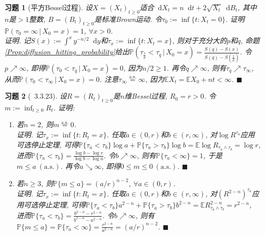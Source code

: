\documentclass{ctexart}
\theoremstyle{definition}
\theoremstyle{remark}
\theoremstyle{plain}
\newtheorem{Ex}{习题}[section]
\newenvironment{Prf}{\vspace{1ex}\textbf{\\}{\color{red}\textit{证明}}.\normalfont}{\color{red}\hfill$\blacksquare$\vspace{1ex}\par}
\newcommand{\1}{\mathbbm{1}}				%
\newcommand{\as}{\mathrm{a.s.}}				%
\renewcommand{\P}{\mathbb{P}}				%
\newcommand{\E}{\mathbb{E}}					%
\renewcommand*{\d}{\mathop{}\!\mathrm{d}}	%
\begin{document}
\begin{Ex}[平方Bessel过程]
设$X = (X_{t})_{t \ge 0}$适合$\d X_{t} = n \d t + 2 \sqrt{X_{t}} \d B_{t}$, 其中$n$是$>1$整数, $B = (B_{t})_{t \ge 0}$是标准Brown运动. 令$\tau_{0} := \inf\{ t : X_{t} = 0 \}$. 证明$\P(\tau_{0}=\infty\,|\,X_{0}=x) = 1$, $\forall x > 0$.
\begin{Prf}
记$S(x) := \int^{x} y^{-n/2} \d y$和$\tau_{x} := \inf\{ t : X_{t} = x \}$, 则对于充分大的$p$和$q$, 命题\ref{Prop:diffusion_hitting_probability}给出$\P(\tau_{\frac{1}{p}}<\tau_{q}\,|\,X_{0}=x) = \frac{S(q)-S(x)}{S(q)-S(\frac{1}{p})}$. 令$p \nearrow \infty$, 即得$\P(\tau_{0}<\tau_{q}\,|\,X_{0}=x) = 0$, 因为$n/2 \ge 1$. 再令$q \nearrow \infty$, 则有$\tau_{q} \nearrow \tau_{\infty}$, 从而$\P(\tau_{0}<\tau_{\infty}\,|\,X_{0}=x) = 0$. 注意$\tau_{\infty} \stackrel{\as}{=} \infty$, 因为$\E X_{t} = \E X_{0} + nt < \infty$.
\end{Prf}
\end{Ex}


\begin{Ex}[\cite{Karatzas-Shreve--GTM113}~3.3.23]\label{Ex:Bessel_infimum}
设$R = (R_{t})_{t \ge 0}$是$n$维Bessel过程, $R_{0} = r > 0$. 令$m := \inf_{t \ge 0} R_{t}$. 证明:
\begin{enumerate}
	\setlength{\itemsep}{0ex}
\item 若$n = 2$, 则$m \stackrel{\as}{=} 0$.
\begin{Prf}
记$\tau_{x} := \inf\{ t : R_{t} = x \}$. 任取$a \in (0,r)$和$b \in (r,\infty)$, 对$\log R^{\tau_{a}}$应用可选停止定理, 可得$\P\{\tau_{a}<\tau_{b}\} \log a + \P\{\tau_{a}>\tau_{b}\} \log b = \E \log R_{\tau_{a}\wedge\tau_{b}} = \log r$, 进而$\P\{\tau_{a}<\tau_{b}\} = \frac{\log b - \log r}{\log b - \log a}$. 令$b \nearrow \infty$, 则有$\P\{\tau_{a}<\infty\} = 1$, 于是$m \le a ~(\as)$. 再令$a \searrow \infty$, 即得$0 \le m \le 0 ~(\as)$.
\end{Prf}
\item 若$n \ge 3$, 则$\P\{ m \le a \} = (a/r)^{n-2}$, $\forall a \in (0,r)$.
\begin{Prf}
记$\tau_{x} := \inf\{ t : R_{t} = x \}$. 任取$a \in (0,r)$和$b \in (r,\infty)$, 对$(R^{2-n})^{\tau_{a}}$应用可选停止定理, 可得$\P\{\tau_{a}<\tau_{b}\} a^{2-n} + \P\{\tau_{a}>\tau_{b}\} b^{2-n} = \E R_{\tau_{a}\wedge\tau_{b}}^{2-n} = r^{2-n}$, 进而$\P\{\tau_{a}<\tau_{b}\} = \frac{b^{2-n}-r^{2-n}}{b^{2-n}-a^{2-n}}$. 令$b \nearrow \infty$, 则有$\P\{ m \le a \} = \P\{\tau_{a}<\infty\} = \frac{r^{2-n}}{a^{2-n}} = (a/r)^{n-2}$.
\end{Prf}
\end{enumerate}
\end{Ex}
\end{document}
